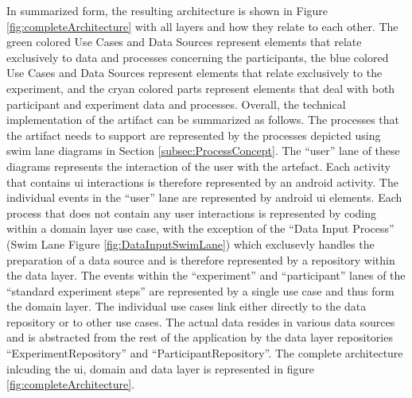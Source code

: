 In summarized form, the resulting architecture is shown in Figure \ref{fig:completeArchitecture} with all layers and how they relate to each other. 
The green colored Use Cases and Data Sources represent elements that relate exclusively to data and processes concerning the participants, the blue colored Use Cases and Data Sources represent elements that relate exclusively to the experiment, and the cryan colored parts represent elements that deal with both participant and experiment data and processes.
Overall, the technical implementation of the artifact can be summarized as follows. The processes that the artifact needs to support are represented by the processes depicted using swim lane diagrams in Section \ref{subsec:ProcessConcept}. The \enquote{user} lane of these diagrams represents the interaction of the user with the artefact. Each activity that contains \ac{ui} interactions is therefore represented by an android activity. The individual events in the \enquote{user} lane are represented by android \ac{ui} elements. Each process that does not contain any user interactions is represented by coding within a domain layer use case, with the exception of the \enquote{Data Input Process} (Swim Lane Figure \ref{fig:DataInputSwimLane}) which exclusevly handles the preparation of a data source and is therefore represented by a repository within the data layer. The events within the \enquote{experiment} and \enquote{participant} lanes of the \enquote{standard experiment steps} are represented by a single use case and thus form the domain layer. The individual use cases link either directly to the data repository or to other use cases. The actual data resides in various data sources and is abstracted from the rest of the application by the data layer repositories \enquote{ExperimentRepository} and \enquote{ParticipantRepository}. The complete architecture inlcuding the \ac{ui}, domain and data layer is represented in figure \ref{fig:completeArchitecture}.

